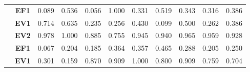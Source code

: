 \begin{table}[htbp]
\begin{tabular}{|cclllllllll|}
		\rowcolor[HTML]{F2F2F2} 
		\multicolumn{1}{|c|}{\cellcolor[HTML]{F2F2F2}} & \multicolumn{1}{c|}{\cellcolor[HTML]{F2F2F2}\textbf{EF1}} & \multicolumn{1}{l|}{\cellcolor[HTML]{F2F2F2}0.089} & \multicolumn{1}{l|}{\cellcolor[HTML]{F2F2F2}0.536} & \multicolumn{1}{l|}{\cellcolor[HTML]{F2F2F2}0.056} & \multicolumn{1}{l|}{\cellcolor[HTML]{F2F2F2}1.000} & \multicolumn{1}{l|}{\cellcolor[HTML]{F2F2F2}0.331} & \multicolumn{1}{l|}{\cellcolor[HTML]{F2F2F2}0.519} & \multicolumn{1}{l|}{\cellcolor[HTML]{F2F2F2}0.343} & \multicolumn{1}{l|}{\cellcolor[HTML]{F2F2F2}0.316} & 0.386 \\ \cline{2-11} 
		\multicolumn{1}{|c|}{\cellcolor[HTML]{F2F2F2}} & \multicolumn{1}{c|}{\textbf{EV1}} & \multicolumn{1}{l|}{0.714} & \multicolumn{1}{l|}{0.635} & \multicolumn{1}{l|}{0.235} & \multicolumn{1}{l|}{0.256} & \multicolumn{1}{l|}{0.430} & \multicolumn{1}{l|}{0.099} & \multicolumn{1}{l|}{0.500} & \multicolumn{1}{l|}{0.262} & 0.386 \\ \cline{2-11} 
		\rowcolor[HTML]{F2F2F2} 
		\multicolumn{1}{|c|}{\multirow{-3}{*}{\cellcolor[HTML]{F2F2F2}\textbf{T03}}} & \multicolumn{1}{c|}{\cellcolor[HTML]{F2F2F2}\textbf{EV2}} & \multicolumn{1}{l|}{\cellcolor[HTML]{F2F2F2}0.978} & \multicolumn{1}{l|}{\cellcolor[HTML]{F2F2F2}1.000} & \multicolumn{1}{l|}{\cellcolor[HTML]{F2F2F2}0.885} & \multicolumn{1}{l|}{\cellcolor[HTML]{F2F2F2}0.755} & \multicolumn{1}{l|}{\cellcolor[HTML]{F2F2F2}0.945} & \multicolumn{1}{l|}{\cellcolor[HTML]{F2F2F2}0.940} & \multicolumn{1}{l|}{\cellcolor[HTML]{F2F2F2}0.965} & \multicolumn{1}{l|}{\cellcolor[HTML]{F2F2F2}0.959} & 0.928 \\ \hline
		\multicolumn{1}{|c|}{\cellcolor[HTML]{F2F2F2}} & \multicolumn{1}{c|}{\textbf{EF1}} & \multicolumn{1}{l|}{0.067} & \multicolumn{1}{l|}{0.204} & \multicolumn{1}{l|}{0.185} & \multicolumn{1}{l|}{0.364} & \multicolumn{1}{l|}{0.357} & \multicolumn{1}{l|}{0.465} & \multicolumn{1}{l|}{0.288} & \multicolumn{1}{l|}{0.205} & 0.250 \\ \cline{2-11} 
		\rowcolor[HTML]{F2F2F2} 
		\multicolumn{1}{|c|}{\cellcolor[HTML]{F2F2F2}} & \multicolumn{1}{c|}{\cellcolor[HTML]{F2F2F2}\textbf{EV1}} & \multicolumn{1}{l|}{\cellcolor[HTML]{F2F2F2}0.301} & \multicolumn{1}{l|}{\cellcolor[HTML]{F2F2F2}0.159} & \multicolumn{1}{l|}{\cellcolor[HTML]{F2F2F2}0.870} & \multicolumn{1}{l|}{\cellcolor[HTML]{F2F2F2}0.909} & \multicolumn{1}{l|}{\cellcolor[HTML]{F2F2F2}1.000} & \multicolumn{1}{l|}{\cellcolor[HTML]{F2F2F2}0.800} & \multicolumn{1}{l|}{\cellcolor[HTML]{F2F2F2}0.909} & \multicolumn{1}{l|}{\cellcolor[HTML]{F2F2F2}0.759} & 0.704 \\ \cline{2-11} 

\end{tabular}
\end{table}
